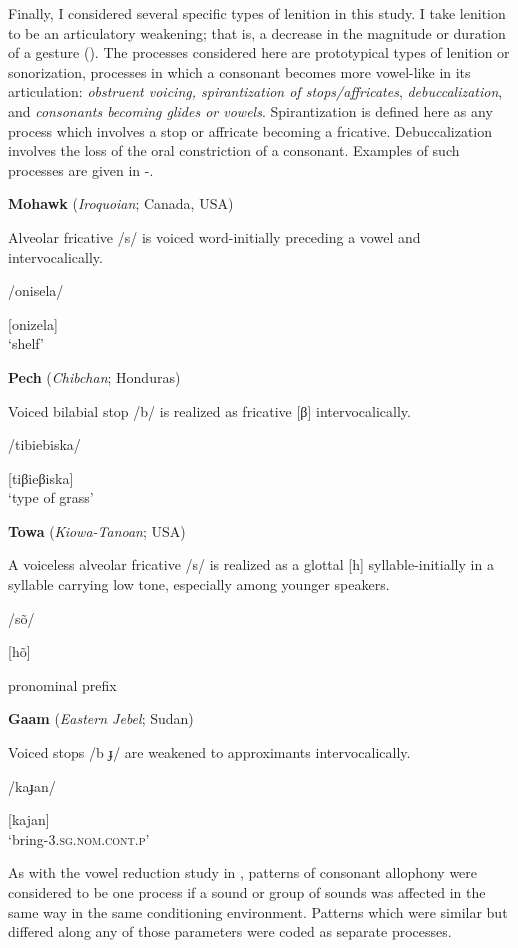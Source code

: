   Finally, I considered several specific types of lenition in this study. I take lenition to be an articulatory weakening; that is, a decrease in the magnitude or duration of a gesture (\citealt{BrowmanGoldstein1992b,MowreyPagliuca1995,BybeeEasterday2019}). The processes considered here are prototypical types of lenition or sonorization, processes in which a consonant becomes more vowel-like in its articulation: \textit{obstruent voicing, spirantization of stops/affricates}, \textit{debuccalization}, and \textit{consonants becoming glides or vowels}. Spirantization is defined here as any process which involves a stop or affricate becoming a fricative. Debuccalization involves the loss of the oral constriction of a consonant. Examples of such processes are given in -.

\ea\label{ex:7.14}
  \textbf{Mohawk} (\textit{Iroquoian}; Canada, USA)

Alveolar fricative /s/ is voiced word-initially preceding a vowel and intervocalically.

/onisela/

[onizela]\\
\glt ‘shelf’
\citep[30-1]{Bonvillain1973}
\z

\ea\label{ex:7.15}
  \textbf{Pech} (\textit{Chibchan}; Honduras)

Voiced bilabial stop /b/ is realized as fricative [β] intervocalically.

/tibiebiska/

[tiβieβiska]\\
\glt ‘type of grass’
\citep[16]{Holt1999}
\z

\ea\label{ex:7.16}
  \textbf{Towa} (\textit{Kiowa-Tanoan}; USA)

A voiceless alveolar fricative /s/ is realized as a glottal [h] syllable-initially in a syllable carrying low tone, especially among younger speakers.

/sõ/

[hõ]

pronominal prefix
\citep[13]{Yumitani1998}
\z

\ea\label{ex:7.17}
  \textbf{Gaam} (\textit{Eastern Jebel}; Sudan)

Voiced stops /b ɟ/ are weakened to approximants intervocalically.

/kaɟan/

[kajan]\\
\glt ‘bring-3.\textsc{sg.nom.cont.p}’
\citep[24-5]{Stirtz2011}
\z

  As with the vowel reduction study in , patterns of consonant allophony were considered to be one process if a sound or group of sounds was affected in the same way in the same conditioning environment. Patterns which were similar but differed along any of those parameters were coded as separate processes.

